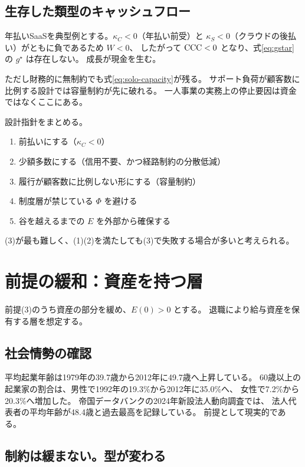 \subsection{生存した類型のキャッシュフロー}

年払いSaaSを典型例とする。$\kappa_C<0$（年払い前受）と
$\kappa_S<0$（クラウドの後払い）がともに負であるため $W<0$、
したがって $\mathrm{CCC}<0$ となり、式\eqref{eq:gstar}の $g^\star$ は存在しない。
成長が現金を生む。

ただし財務的に無制約でも式\eqref{eq:solo-capacity}が残る。
サポート負荷が顧客数に比例する設計では容量制約が先に破れる。
一人事業の実務上の停止要因は資金ではなくここにある。

設計指針をまとめる。

\begin{enumerate}[label=(\arabic*)]
\item 前払いにする（$\kappa_C<0$）
\item 少額多数にする（信用不要、かつ経路制約の分散低減）
\item 履行が顧客数に比例しない形にする（容量制約）
\item 制度層が禁じている $\Phi$ を避ける
\item 谷を越えるまでの $E$ を外部から確保する
\end{enumerate}

(3)が最も難しく、(1)(2)を満たしても(3)で失敗する場合が多いと考えられる。

\section{前提の緩和：資産を持つ層}
\label{sec:retiree}

前提(3)のうち資産の部分を緩め、$E(0)>0$ とする。
退職により給与資産を保有する層を想定する。

\subsection{社会情勢の確認}

平均起業年齢は1979年の39.7歳から2012年に49.7歳へ上昇している。
60歳以上の起業家の割合は、男性で1992年の19.3\%から2012年に35.0\%へ、
女性で7.2\%から20.3\%へ増加した。
帝国データバンクの2024年新設法人動向調査では、
法人代表者の平均年齢が48.4歳と過去最高を記録している。
前提として現実的である。

\subsection{制約は緩まない。型が変わる}

